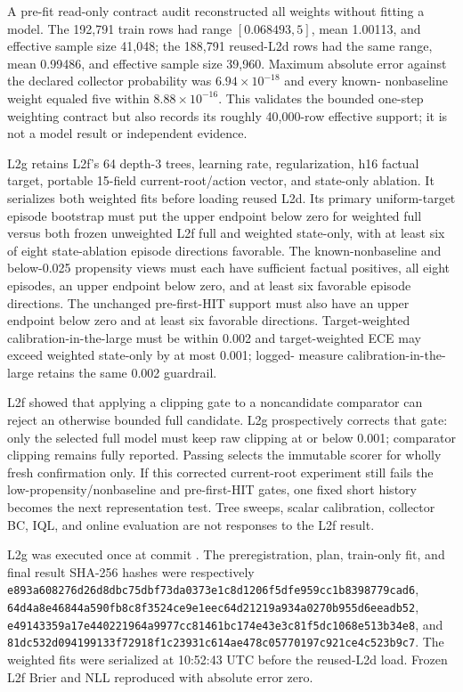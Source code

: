 \documentclass[11pt]{article}
\begin{document}
A pre-fit read-only contract audit reconstructed all weights without fitting a
model.  The 192,791 train rows had range $[0.068493,5]$, mean 1.00113, and
effective sample size 41,048; the 188,791 reused-L2d rows had the same range,
mean 0.99486, and effective sample size 39,960.  Maximum absolute error against
the declared collector probability was $6.94\times10^{-18}$ and every known-
nonbaseline weight equaled five within $8.88\times10^{-16}$.  This validates
the bounded one-step weighting contract but also records its roughly 40,000-row
effective support; it is not a model result or independent evidence.

L2g retains L2f's 64 depth-3 trees, learning rate, regularization, h16 factual
target, portable 15-field current-root/action vector, and state-only ablation.
It serializes both weighted fits before loading reused L2d.  Its primary
uniform-target episode bootstrap must put the upper endpoint below zero for
weighted full versus both frozen unweighted L2f full and weighted state-only,
with at least six of eight state-ablation episode directions favorable.  The
known-nonbaseline and below-0.025 propensity views must each have sufficient
factual positives, all eight episodes, an upper endpoint below zero, and at
least six favorable episode directions.  The unchanged pre-first-HIT support
must also have an upper endpoint below zero and at least six favorable
directions.  Target-weighted calibration-in-the-large must be within 0.002 and
target-weighted ECE may exceed weighted state-only by at most 0.001; logged-
measure calibration-in-the-large retains the same 0.002 guardrail.

L2f showed that applying a clipping gate to a noncandidate comparator can
reject an otherwise bounded full candidate.  L2g prospectively corrects that
gate: only the selected full model must keep raw clipping at or below 0.001;
comparator clipping remains fully reported.  Passing selects the immutable
scorer for wholly fresh confirmation only.  If this corrected current-root
experiment still fails the low-propensity/nonbaseline and pre-first-HIT gates,
one fixed short history becomes the next representation test.  Tree sweeps,
scalar calibration, collector BC, IQL, and online evaluation are not responses
to the L2f result.

L2g was executed once at commit
.  The preregistration, plan,
train-only fit, and final result SHA-256 hashes were respectively
\texttt{e893a608276d26d8dbc75dbf73da0373e1c8d1206f5dfe959cc1b8398779cad6},
\texttt{64d4a8e46844a590fb8c8f3524ce9e1eec64d21219a934a0270b955d6eeadb52},
\texttt{e49143359a17e440221964a9977cc81461bc174e43e3c81f5dc1068e513b34e8},
and
\texttt{81dc532d094199133f72918f1c23931c614ae478c05770197c921ce4c523b9c7}.
The weighted fits were serialized at 10:52:43 UTC before the reused-L2d load.
Frozen L2f Brier and NLL reproduced with absolute error zero.
\end{document}
